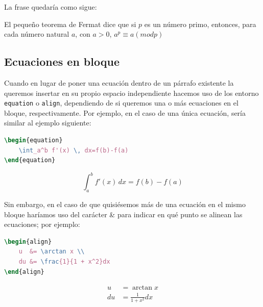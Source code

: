 \documentclass[%
    school=etsisi,%
    type=pfg,%
    degree=61CI,%
]{upm-report}
\begin{document}
La frase quedaría como sigue:

El pequeño teorema de Fermat dice que si $p$ es un número primo, entonces, para cada número natural $a$, con $a>0$, $a^p \equiv a (mod p)$

\subsection{Ecuaciones en bloque}

Cuando en lugar de poner una ecuación dentro de un párrafo existente la queremos insertar en su propio espacio independiente hacemos uso de los entorno \texttt{equation} o \texttt{align}, dependiendo de si queremos una o más ecuaciones en el bloque, respectivamente. Por ejemplo, en el caso de una única ecuación, sería similar al ejemplo siguiente:

\begin{minipage}[c]{.5\textwidth}
\begin{lstlisting}[language=tex]
\begin{equation}
	\int_a^b f'(x) \, dx=f(b)-f(a)
\end{equation}
\end{lstlisting}
\end{minipage}%
\begin{minipage}[c]{.5\textwidth}
\begin{equation}
    \int_a^b f'(x) \, dx=f(b)-f(a)
\end{equation}
\end{minipage}

Sin embargo, en el caso de que quisiésemos más de una ecuación en el mismo bloque haríamos uso del carácter \& para indicar en qué punto se alinean las ecuaciones; por ejemplo:

\begin{minipage}[c]{.5\textwidth}
\begin{lstlisting}[language=tex]
\begin{align}
    u  &= \arctan x \\ 
    du &= \frac{1}{1 + x^2}dx
\end{align}
\end{lstlisting}
\end{minipage}%
\begin{minipage}[c]{.5\textwidth}
\begin{align}
    u  &= \arctan x \\ 
    du &= \frac{1}{1 + x^2}dx
\end{align}
\end{minipage}
\end{document}

